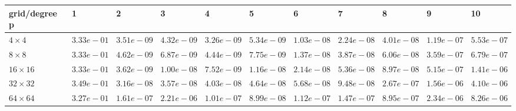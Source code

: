 \begin{tabular}{lllllllllll}
\hline
 grid/degree p   & 1          & 2          & 3          & 4          & 5          & 6          & 7          & 8          & 9          & 10         \\
\hline
 $4 \times 4$    & $3.33e-01$ & $3.51e-09$ & $4.32e-09$ & $3.26e-09$ & $5.34e-09$ & $1.03e-08$ & $2.24e-08$ & $4.01e-08$ & $1.19e-07$ & $5.53e-07$ \\
 $8 \times 8$    & $3.33e-01$ & $4.62e-09$ & $6.87e-09$ & $4.44e-09$ & $7.75e-09$ & $1.37e-08$ & $3.87e-08$ & $6.06e-08$ & $3.59e-07$ & $6.79e-07$ \\
 $16 \times 16$  & $3.33e-01$ & $3.62e-09$ & $1.00e-08$ & $7.52e-09$ & $1.16e-08$ & $2.14e-08$ & $5.36e-08$ & $8.97e-08$ & $5.15e-07$ & $1.41e-06$ \\
 $32 \times 32$  & $3.49e-01$ & $3.16e-08$ & $3.57e-08$ & $4.03e-08$ & $4.64e-08$ & $5.68e-08$ & $9.48e-08$ & $2.67e-07$ & $1.56e-06$ & $4.10e-06$ \\
 $64 \times 64$  & $3.27e-01$ & $1.61e-07$ & $2.21e-06$ & $1.01e-07$ & $8.99e-08$ & $1.12e-07$ & $1.47e-07$ & $8.95e-07$ & $2.34e-06$ & $8.26e-06$ \\
\hline
\end{tabular}